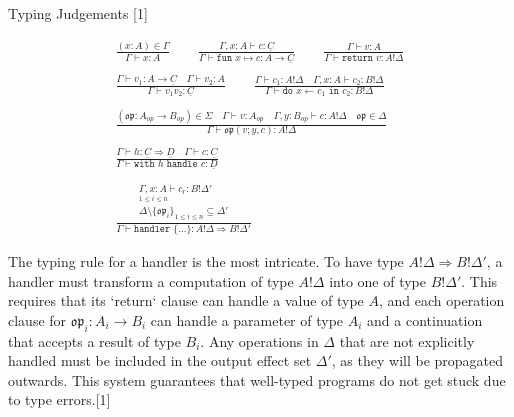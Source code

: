 \documentclass{article}
\begin{document}
\begin{table}[h!]
\centering
\caption{Typing Judgements [1]}
\label{tab:typing}
\begin{gather*}
\frac{(x:A) \in \Gamma}{\Gamma \vdash x:A}
\qquad
\frac{\Gamma, x:A \vdash c: \underline{C}}{\Gamma \vdash \texttt{fun } x \mapsto c: A \rightarrow \underline{C}}
\qquad
\frac{\Gamma \vdash v:A}{\Gamma \vdash \texttt{return } v: A!\Delta}
\\ \\
\frac{\Gamma \vdash v_1: A \rightarrow \underline{C} \quad \Gamma \vdash v_2: A}{\Gamma \vdash v_1 v_2: \underline{C}}
\qquad
\frac{\Gamma \vdash c_1: A!\Delta \quad \Gamma, x:A \vdash c_2: B!\Delta}{\Gamma \vdash \texttt{do } x \leftarrow c_1 \texttt{ in } c_2: B!\Delta}
\\ \\
\frac{(\mathfrak{op}: A_{op} \rightarrow B_{op}) \in \Sigma \quad \Gamma \vdash v: A_{op} \quad \Gamma, y:B_{op} \vdash c: A!\Delta \quad \mathfrak{op} \in \Delta}{\Gamma \vdash \mathfrak{op}(v;y,c): A!\Delta}
\\ \\
\frac{\Gamma \vdash h: \underline{C} \Rightarrow \underline{D} \quad \Gamma \vdash c: \underline{C}}{\Gamma \vdash \texttt{with } h \texttt{ handle } c: \underline{D}}
\\ \\
\frac{
\begin{array}{c}
\Gamma, x:A \vdash c_{r}:B!\Delta' \\
{_{1\le i\le n}} \\
\Delta \setminus \{\mathfrak{op}_{i}\}_{1\le i\le n} \subseteq \Delta'
\end{array}
}
{\Gamma \vdash \texttt{handler } \{\dots\}: A!\Delta \Rightarrow B!\Delta'}
\end{gather*}
\end{table}

The typing rule for a handler is the most intricate. To have type $A!\Delta \Rightarrow B!\Delta'$, a handler must transform a computation of type $A!\Delta$ into one of type $B!\Delta'$. This requires that its `return` clause can handle a value of type $A$, and each operation clause for $\mathfrak{op}_i: A_i \rightarrow B_i$ can handle a parameter of type $A_i$ and a continuation that accepts a result of type $B_i$. Any operations in $\Delta$ that are not explicitly handled must be included in the output effect set $\Delta'$, as they will be propagated outwards. This system guarantees that well-typed programs do not get stuck due to type errors.[1]
\end{document}
